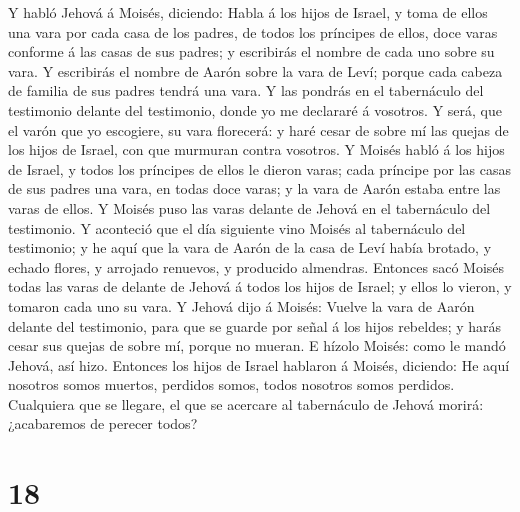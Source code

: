  Y habló Jehová á Moisés, diciendo:  Habla á
los hijos de Israel, y toma de ellos una vara por cada casa de los
padres, de todos los príncipes de ellos, doce varas conforme á las casas
de sus padres; y escribirás el nombre de cada uno sobre su vara.
 Y escribirás el nombre de Aarón sobre la vara de Leví;
porque cada cabeza de familia de sus padres tendrá una vara.
 Y las pondrás en el tabernáculo del testimonio delante
del testimonio, donde yo me declararé á vosotros.  Y será,
que el varón que yo escogiere, su vara florecerá: y haré cesar de sobre
mí las quejas de los hijos de Israel, con que murmuran contra vosotros.
 Y Moisés habló á los hijos de Israel, y todos los
príncipes de ellos le dieron varas; cada príncipe por las casas de sus
padres una vara, en todas doce varas; y la vara de Aarón estaba entre
las varas de ellos.  Y Moisés puso las varas delante de
Jehová en el tabernáculo del testimonio.  Y aconteció que
el día siguiente vino Moisés al tabernáculo del testimonio; y he aquí
que la vara de Aarón de la casa de Leví había brotado, y echado flores,
y arrojado renuevos, y producido almendras.  Entonces sacó
Moisés todas las varas de delante de Jehová á todos los hijos de Israel;
y ellos lo vieron, y tomaron cada uno su vara.  Y Jehová
dijo á Moisés: Vuelve la vara de Aarón delante del testimonio, para que
se guarde por señal á los hijos rebeldes; y harás cesar sus quejas de
sobre mí, porque no mueran.  E hízolo Moisés: como le
mandó Jehová, así hizo.  Entonces los hijos de Israel
hablaron á Moisés, diciendo: He aquí nosotros somos muertos, perdidos
somos, todos nosotros somos perdidos.  Cualquiera que se
llegare, el que se acercare al tabernáculo de Jehová morirá: ¿acabaremos
de perecer todos?

\hypertarget{section-17}{%
\section{18}\label{section-17}}

